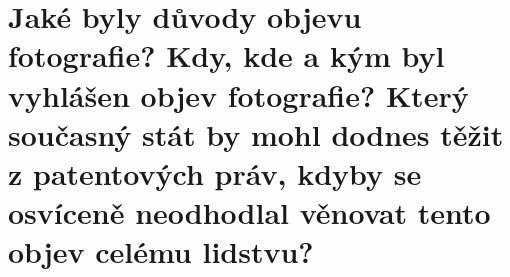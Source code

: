 \section{Jaké byly důvody objevu fotografie? Kdy, kde a kým byl vyhlášen objev fotografie? Který současný stát by mohl 
dodnes těžit z patentových práv, kdyby se osvíceně neodhodlal věnovat tento objev celému lidstvu?}